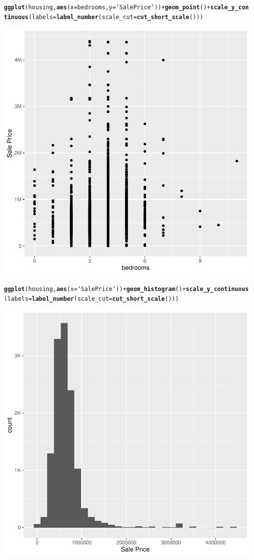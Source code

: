 \documentclass{article}\usepackage[]{graphicx}\usepackage[]{xcolor}
\makeatletter
\newcommand{\hlopt}[1]{\textcolor[rgb]{0,0,0}{#1}}%
\newcommand{\hlstd}[1]{\textcolor[rgb]{0.345,0.345,0.345}{#1}}%
\newcommand{\hlkwc}[1]{\textcolor[rgb]{0.333,0.667,0.333}{#1}}%
\newcommand{\hlkwd}[1]{\textcolor[rgb]{0.737,0.353,0.396}{\textbf{#1}}}%
\newenvironment{kframe}{%
 \def\at@end@of@kframe{}%
 \ifinner\ifhmode%
  \def\at@end@of@kframe{\end{minipage}}%
  \begin{minipage}{\columnwidth}%
 \fi\fi%
 \def\FrameCommand##1{\hskip\@totalleftmargin \hskip-\fboxsep
 \colorbox{shadecolor}{##1}\hskip-\fboxsep
     \hskip-\linewidth \hskip-\@totalleftmargin \hskip\columnwidth}%
 \MakeFramed {\advance\hsize-\width
   \@totalleftmargin\z@ \linewidth\hsize
   \@setminipage}}%
 {\par\unskip\endMakeFramed%
 \at@end@of@kframe}
\newenvironment{knitrout}{}{} %
\makeatother
\begin{document}
\begin{knitrout}
\begin{kframe}\begin{alltt}
\hlkwd{ggplot}\hlstd{(housing,} \hlkwd{aes}\hlstd{(}\hlkwc{x}\hlstd{=bedrooms,} \hlkwc{y}\hlstd{=`Sale Price`))} \hlopt{+} \hlkwd{geom_point}\hlstd{()} \hlopt{+} \hlkwd{scale_y_continuous}\hlstd{(}\hlkwc{labels} \hlstd{=} \hlkwd{label_number}\hlstd{(}\hlkwc{scale_cut} \hlstd{=} \hlkwd{cut_short_scale}\hlstd{()))}
\end{alltt}
\end{kframe}

{\centering \includegraphics[width=.6\linewidth]{figure/DSC520-week4-housing-TangXin-Rnwauto-report-2} 

}


\begin{kframe}\begin{alltt}
\hlkwd{ggplot}\hlstd{(housing,} \hlkwd{aes}\hlstd{(}\hlkwc{x}\hlstd{=`Sale Price`))} \hlopt{+}\hlkwd{geom_histogram}\hlstd{()} \hlopt{+} \hlkwd{scale_y_continuous}\hlstd{(}\hlkwc{labels} \hlstd{=} \hlkwd{label_number}\hlstd{(}\hlkwc{scale_cut} \hlstd{=} \hlkwd{cut_short_scale}\hlstd{()))}
\end{alltt}


{\ttfamily\noindent\itshape\color{messagecolor}{\#\# `stat\_bin()` using `bins = 30`. Pick better value with `binwidth`.}}\end{kframe}

{\centering \includegraphics[width=.6\linewidth]{figure/DSC520-week4-housing-TangXin-Rnwauto-report-3} 

}


\end{knitrout}
\end{document}
